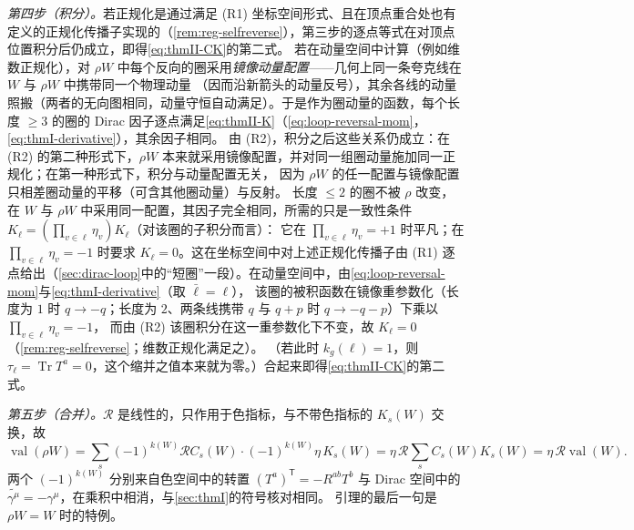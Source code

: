 \documentclass[UTF8,a4paper,11pt,fontset=fandol]{ctexart}
\makeatletter
\theoremstyle{cplain}
\theoremstyle{cdefinition}
\theoremstyle{cremark}
\renewcommand{\proofname}{证明}
\renewenvironment{proof}[1][\proofname]{\par\pushQED{\qed}\normalfont\topsep6\p@\@plus6\p@\relax
  \trivlist\item[\hskip\labelsep\itshape #1\hspace{0.5em}]\ignorespaces}{\popQED\endtrivlist\@endpefalse}
\numberwithin{equation}{section}
\DeclareMathOperator{\Tr}{Tr}
\newcommand{\tp}{\mathsf{T}}                         %
\newcommand{\Rop}{\mathcal{R}}                       %
\newcommand{\Cconj}[1]{\widetilde{#1}}              %
\makeatother
\begin{document}
\begin{proof}
\emph{第四步（积分）。}若正规化是通过满足 (R1) 坐标空间形式、且在顶点重合处也有定义的正规化传播子实现的（\cref{rem:reg-selfreverse}），第三步的逐点等式在对顶点位置积分后仍成立，即得\cref{eq:thmII-CK}的第二式。
若在动量空间中计算（例如维数正规化），对 $\rho W$ 中每个反向的圈采用\emph{镜像动量配置}——几何上同一条夸克线在 $W$ 与 $\rho W$ 中携带同一个物理动量
（因而沿新箭头的动量反号），其余各线的动量照搬（两者的无向图相同，动量守恒自动满足）。于是作为圈动量的函数，每个长度 $\ge3$ 的圈的 Dirac 因子逐点满足\cref{eq:thmII-K}（\cref{eq:loop-reversal-mom}，\cref{eq:thmI-derivative}），其余因子相同。
由 (R2)，积分之后这些关系仍成立：在 (R2) 的第二种形式下，$\rho W$ 本来就采用镜像配置，并对同一组圈动量施加同一正规化；在第一种形式下，积分与动量配置无关，
因为 $\rho W$ 的任一配置与镜像配置只相差圈动量的平移（可含其他圈动量）与反射。
长度 $\le2$ 的圈不被 $\rho$ 改变，在 $W$ 与 $\rho W$ 中采用同一配置，其因子完全相同，所需的只是一致性条件 $K_\ell=(\prod_{v\in\ell}\eta_v)K_\ell$（对该圈的子积分而言）：
它在 $\prod_{v\in\ell}\eta_v=+1$ 时平凡；在 $\prod_{v\in\ell}\eta_v=-1$ 时要求 $K_\ell=0$。这在坐标空间中对上述正规化传播子由 (R1) 逐点给出（\cref{sec:dirac-loop}中的“短圈”一段）。在动量空间中，由\cref{eq:loop-reversal-mom}与\cref{eq:thmI-derivative}（取 $\bar\ell=\ell$），
该圈的被积函数在镜像重参数化（长度为 $1$ 时 $q\to-q$；长度为 $2$、两条线携带 $q$ 与 $q+p$ 时 $q\to-q-p$）下乘以 $\prod_{v\in\ell}\eta_v=-1$，
而由 (R2) 该圈积分在这一重参数化下不变，故 $K_\ell=0$（\cref{rem:reg-selfreverse}；维数正规化满足之）。
（若此时 $k_g(\ell)=1$，则 $\tau_\ell=\Tr T^a=0$，这个缩并之值本来就为零。）合起来即得\cref{eq:thmII-CK}的第二式。

\emph{第五步（合并）。}$\Rop$ 是线性的，只作用于色指标，与不带色指标的 $K_s(W)$ 交换，故
\[
\operatorname{val}(\rho W)=\sum_s(-1)^{k(W)}\Rop C_s(W)\cdot(-1)^{k(W)}\eta\,K_s(W)=\eta\,\Rop\sum_sC_s(W)K_s(W)=\eta\,\Rop\operatorname{val}(W).
\]
两个 $(-1)^{k(W)}$ 分别来自色空间中的转置 $(T^a)^{\tp}=-R^{ab}T^b$ 与 Dirac 空间中的 $\Cconj{\gamma^\mu}=-\gamma^\mu$，在乘积中相消，与\cref{sec:thmI}的符号核对相同。
引理的最后一句是 $\rho W=W$ 时的特例。
\end{proof}
\end{document}
